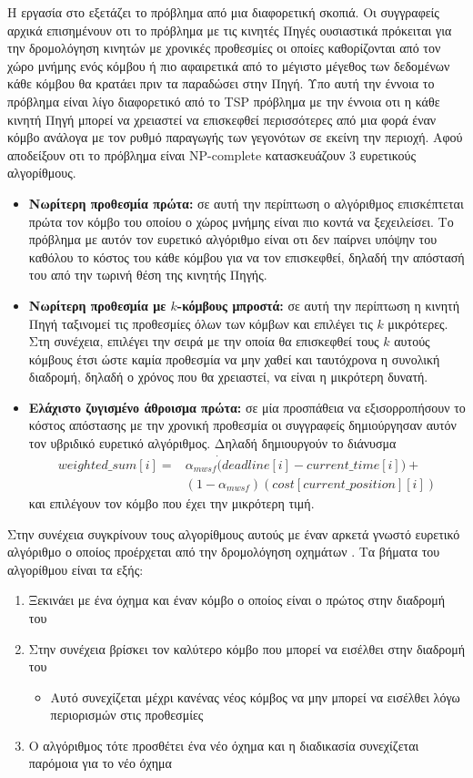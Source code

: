 Η εργασία στο \cite{dynamic_deadlines} εξετάζει το πρόβλημα από μια διαφορετική σκοπιά. Οι συγγραφείς αρχικά επισημένουν οτι το πρόβλημα με τις κινητές Πηγές
ουσιαστικά πρόκειται για την δρομολόγηση κινητών με χρονικές προθεσμίες οι οποίες καθορίζονται από τον χώρο μνήμης ενός κόμβου ή πιο αφαιρετικά από το μέγιστο μέγεθος
των δεδομένων κάθε κόμβου θα κρατάει πριν τα παραδώσει στην Πηγή. Υπο αυτή την έννοια το πρόβλημα είναι λίγο διαφορετικό από το TSP πρόβλημα με την έννοια οτι η κάθε
κινητή Πηγή μπορεί να χρειαστεί να επισκεφθεί περισσότερες από μια φορά έναν κόμβο ανάλογα με τον ρυθμό παραγωγής των γεγονότων σε εκείνη την περιοχή. Αφού
αποδείξουν οτι το πρόβλημα είναι NP-complete κατασκευάζουν 3 ευρετικούς αλγορίθμους.
\begin{itemize}
\item \textbf{Νωρίτερη προθεσμία πρώτα:} σε αυτή την περίπτωση ο αλγόριθμος επισκέπτεται πρώτα τον κόμβο του οποίου ο χώρος μνήμης είναι πιο κοντά να ξεχειλείσει. Το
πρόβλημα με αυτόν τον ευρετικό αλγόριθμο είναι οτι δεν παίρνει υπόψην του καθόλου το κόστος του κάθε κόμβου για να τον επισκεφθεί, δηλαδή την απόστασή του από την
τωρινή θέση της κινητής Πηγής.
\item \textbf{Νωρίτερη προθεσμία με $k$-κόμβους μπροστά:} σε αυτή την περίπτωση η κινητή Πηγή ταξινομεί τις προθεσμίες όλων των κόμβων και επιλέγει τις $k$
μικρότερες. Στη συνέχεια, επιλέγει την σειρά με την οποία θα επισκεφθεί τους $k$ αυτούς κόμβους έτσι ώστε καμία προθεσμία να μην χαθεί και ταυτόχρονα η συνολική
διαδρομή, δηλαδή ο χρόνος που θα χρειαστεί, να είναι η μικρότερη δυνατή.
\item \textbf{Ελάχιστο ζυγισμένο άθροισμα πρώτα:} σε μία προσπάθεια να εξισορροπήσουν το κόστος απόστασης με την χρονική προθεσμία οι συγγραφείς δημιούργησαν αυτόν
τον υβριδικό ευρετικό αλγόριθμος. Δηλαδή δημιουργούν το διάνυσμα
\begin{align*}
weighted\_sum[i] = & \alpha_{mwsf}\dot (deadline[i]-current\_time[i]) +\\
& (1-\alpha_{mwsf})(cost[current\_position][i])
\end{align*} και επιλέγουν τον κόμβο που έχει την μικρότερη τιμή.
\end{itemize}
Στην συνέχεια συγκρίνουν τους αλγορίθμους αυτούς με έναν αρκετά γνωστό
ευρετικό αλγόριθμο ο οποίος προέρχεται από την δρομολόγηση οχημάτων \cite{vehicle_routing_windows}. Τα βήματα του αλγορίθμου είναι τα εξής:
\begin{enumerate}
\item Ξεκινάει με ένα όχημα και έναν κόμβο ο οποίος είναι ο πρώτος στην διαδρομή του
\item Στην συνέχεια βρίσκει τον καλύτερο κόμβο που μπορεί να εισέλθει στην διαδρομή του
\begin{itemize}
	\item Αυτό συνεχίζεται μέχρι κανένας νέος κόμβος να μην μπορεί να εισέλθει λόγω περιορισμών στις προθεσμίες
\end{itemize}
\item Ο αλγόριθμος τότε προσθέτει ένα νέο όχημα και η διαδικασία συνεχίζεται παρόμοια για το νέο όχημα
\end{enumerate}
